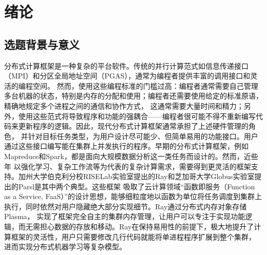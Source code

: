 
\chapter{绪论}
\label{cha:introduction}
\section{选题背景与意义}
\label{sec:background}

分布式计算框架是一种复杂的平台软件。传统的并行计算范式如信息传递接口（MPI\cite{gabriel2004open}）和分区全局地址空间（PGAS\cite{zheng2014upc++}），通常为编程者提供丰富的调用接口和灵活的编程空间。
然而，使用这些编程标准的门槛过高：编程者通常需要自己管理多台机器的状态，特别是内存的分配和使用；编程者还需要使用给定的标准原语，精确地规定多个进程之间的通信和协作方式，
这通常需要大量时间和精力；另外，使用这些范式将导致程序和功能的强耦合——编程者很可能不得不重新编写代码来更新程序的逻辑。因此，现代分布式计算框架通常承担了上述硬件管理的角色，
并针对目标任务类型，为用户设计尽可能少、但简单易用的功能接口。用户通过这些接口编写能在集群上并发执行的程序。早期的分布式计算框架，例如Mapreduce\cite{dean2008mapreduce}和Spark\cite{zaharia2010spark}，都是面向大规模数据分析这一类任务而设计的。然而，近些年
以强化学习、复杂工作流等为代表的复杂计算需求，需要得到更灵活的框架支持。加州大学伯克利分校RISELab实验室提出的Ray\cite{moritz2018ray}和芝加哥大学Globus实验室提出的Parsl\cite{babuji2019parsl}是其中两个典型。这些框架
吸取了云计算领域“函数即服务（Function as a Service, FaaS）”的设计思想，能够细粒度地以函数为单位将任务调度到集群上执行，同时依然对用户隐藏绝大部分实现细节。Ray通过分布式内存对象存储Plasma\cite{plasma}，
实现了框架完全自主的集群内存管理，让用户可以专注于实现功能逻辑，而无需担心数据的存放和移动。Ray在保持易用性的前提下，极大地提升了计算框架的灵活性，用户只需要修改几行代码就能将单进程程序扩展到整个集群，
进而实现分布式机器学习等复杂模型。

